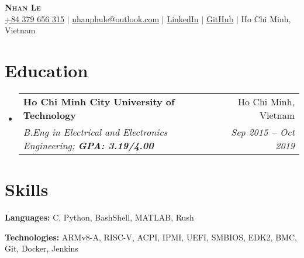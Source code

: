 \documentclass[letterpaper,11pt]{article}
\makeatletter
\newcommand{\resumeEducationHeading}[4]{
  \vspace{-2pt}\item
    \begin{tabular*}{0.97\textwidth}[t]{l@{\extracolsep{\fill}}r}
      \textbf{#1} & #2 \\
      \textit{\small#3} & \textit{\small #4} \\
    \end{tabular*}\vspace{-5pt}
}
\newcommand{\resumeSubHeadingListStart}{\begin{itemize}[leftmargin=0.15in, label={}]}
\newcommand{\resumeSubHeadingListEnd}{\end{itemize}}
\makeatother
\begin{document}

\begin{center}
    \textbf{\Huge \scshape Nhan Le} \\ \vspace{3pt}
    \small
    \faMobile \hspace{.5pt} \href{tel:+84379656315}{+84 379 656 315}
    $|$
    \faAt \hspace{.5pt} \href{mailto:nhanphule@outlook.com}{nhanphule@outlook.com}
    $|$
    \faLinkedinSquare \hspace{.5pt} \href{https://www.linkedin.com/in/nhanlephu}{LinkedIn}
    $|$
    \faGithub \hspace{.5pt} \href{https://github.com/nhanplee}{GitHub}
    $|$
    \faMapMarker \hspace{.5pt} {Ho Chi Minh, Vietnam}
\end{center}




\section{Education}
  \vspace{3pt}
  \resumeSubHeadingListStart
    \resumeEducationHeading
      {Ho Chi Minh City University of Technology}{Ho Chi Minh, Vietnam}
      {B.Eng in Electrical and Electronics Engineering; \textbf{GPA: 3.19/4.00}}{Sep 2015 \textbf{--} Oct 2019}
  \resumeSubHeadingListEnd




\section{Skills}
  \vspace{2pt}
  \resumeSubHeadingListStart
    \small{\item{
        
        \textbf{Languages:}{ C, Python, BashShell, MATLAB, Rush} \\ \vspace{3pt}
        
        \textbf{Technologies:}{ ARMv8-A, RISC-V, ACPI, IPMI, UEFI, SMBIOS, EDK2, BMC, Git, Docker, Jenkins} \\ \vspace{3pt}
        
    }}
  \resumeSubHeadingListEnd
\end{document}
